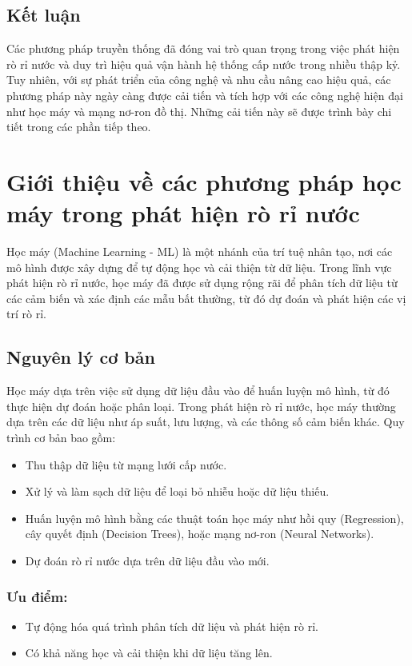 \subsection{Kết luận}
Các phương pháp truyền thống đã đóng vai trò quan trọng trong việc phát hiện rò rỉ nước và duy trì hiệu quả vận hành hệ thống cấp nước trong nhiều thập kỷ. Tuy nhiên, với sự phát triển của công nghệ và nhu cầu nâng cao hiệu quả, các phương pháp này ngày càng được cải tiến và tích hợp với các công nghệ hiện đại như học máy và mạng nơ-ron đồ thị. Những cải tiến này sẽ được trình bày chi tiết trong các phần tiếp theo.


\section{Giới thiệu về các phương pháp học máy trong phát hiện rò rỉ nước}

Học máy (Machine Learning - ML) là một nhánh của trí tuệ nhân tạo, nơi các mô hình được xây dựng để tự động học và cải thiện từ dữ liệu. Trong lĩnh vực phát hiện rò rỉ nước, học máy đã được sử dụng rộng rãi để phân tích dữ liệu từ các cảm biến và xác định các mẫu bất thường, từ đó dự đoán và phát hiện các vị trí rò rỉ.

\subsection{Nguyên lý cơ bản}
Học máy dựa trên việc sử dụng dữ liệu đầu vào để huấn luyện mô hình, từ đó thực hiện dự đoán hoặc phân loại. Trong phát hiện rò rỉ nước, học máy thường dựa trên các dữ liệu như áp suất, lưu lượng, và các thông số cảm biến khác. Quy trình cơ bản bao gồm:
\begin{itemize}
    \item Thu thập dữ liệu từ mạng lưới cấp nước.
    \item Xử lý và làm sạch dữ liệu để loại bỏ nhiễu hoặc dữ liệu thiếu.
    \item Huấn luyện mô hình bằng các thuật toán học máy như hồi quy (Regression), cây quyết định (Decision Trees), hoặc mạng nơ-ron (Neural Networks).
    \item Dự đoán rò rỉ nước dựa trên dữ liệu đầu vào mới.
\end{itemize}

\subsubsection{Ưu điểm:}
\begin{itemize}
    \item Tự động hóa quá trình phân tích dữ liệu và phát hiện rò rỉ.
    \item Có khả năng học và cải thiện khi dữ liệu tăng lên.
\end{itemize}

